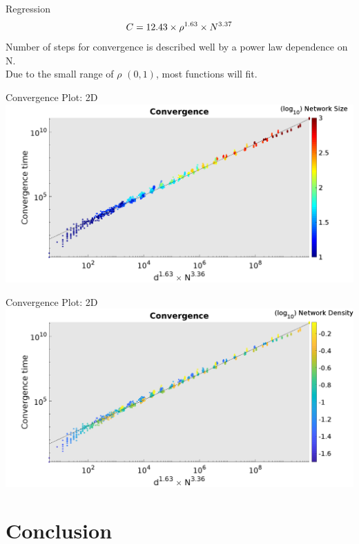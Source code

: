 \documentclass[10pt]{beamer}
\begin{document}
\begin{frame}{Regression}
    \begin{equation*}
        \centering
        C = 12.43 \times \rho^{1.63} \times N^{3.37}
    \end{equation*}
    Number of steps for convergence is described well by a power law dependence
    on N. \\ Due to the small range of $\rho$ $(0,1)$, most functions will fit.
\end{frame}

\begin{frame}{Convergence Plot: 2D}
    \includegraphics[width=\textwidth]{png/data_conv_sizecol.png}
\end{frame}

\begin{frame}{Convergence Plot: 2D}
    \includegraphics[width=\textwidth]{png/data_conv_denscol.png}
\end{frame}

\section{Conclusion}
\end{document}
